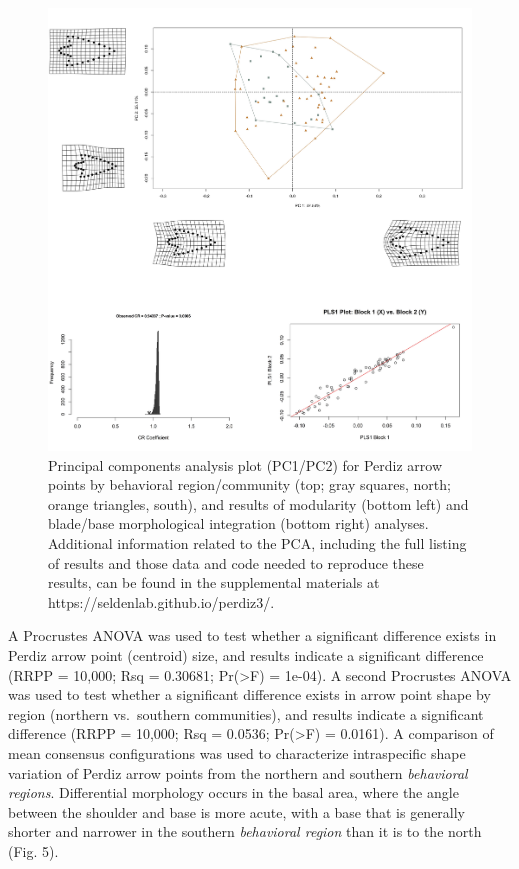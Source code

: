 \documentclass[smallextended]{svjour3}       %
\begin{document}
\begin{figure}
\includegraphics[width=1\linewidth]{ms-figs/figure4} \caption{Principal components analysis plot (PC1/PC2) for Perdiz arrow points by behavioral region/community (top; gray squares, north; orange triangles, south), and results of modularity (bottom left) and blade/base morphological integration (bottom right) analyses. Additional information related to the PCA, including the full listing of results and those data and code needed to reproduce these results, can be found in the supplemental materials at https://seldenlab.github.io/perdiz3/.}\label{fig:fig4}
\end{figure}

A Procrustes ANOVA was used to test whether a significant difference
exists in Perdiz arrow point (centroid) size, and results indicate a
significant difference (RRPP = 10,000; Rsq = 0.30681; Pr(\textgreater F)
= 1e-04). A second Procrustes ANOVA was used to test whether a
significant difference exists in arrow point shape by region (northern
vs.~southern communities), and results indicate a significant difference
(RRPP = 10,000; Rsq = 0.0536; Pr(\textgreater F) = 0.0161). A comparison
of mean consensus configurations was used to characterize intraspecific
shape variation of Perdiz arrow points from the northern and southern
\emph{behavioral regions}. Differential morphology occurs in the basal
area, where the angle between the shoulder and base is more acute, with
a base that is generally shorter and narrower in the southern
\emph{behavioral region} than it is to the north (Fig. 5).
\end{document}
